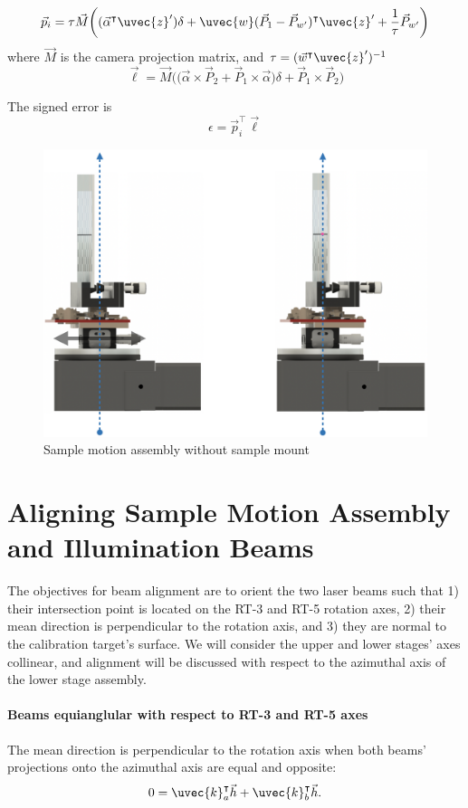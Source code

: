 \begin{equation}
    \vec{p}_i = \tau \vec{M}\bigg((\vec{\alpha}^\intercal \uvec{z}') \delta + \uvec{w}(\vec{P}_1 - \vec{P}_{w'})^\intercal \uvec{z}'  + \frac{1}{\tau} \vec{P}_{w'} \bigg)
\end{equation}
where $\vec{M}$ is the camera projection matrix, and $\tau = (\vec{w}^\intercal \uvec{z}')^{-1}$
\begin{equation}
    \vec{\ell} = \vec{M} \Big(\big(\vec{\alpha} \times \vec{P}_2 + \vec{P}_1 \times \vec{\alpha}\big)\delta + \vec{P}_1 \times \vec{P}_2 \Big)
\end{equation}

The signed error is
\begin{equation}
    \epsilon = \vec{p}^\intercal_i \vec{\ell}
\end{equation}

\begin{figure}
    \centering
    \includegraphics[width=0.5\linewidth]{figures/compact_alignment.png}
    \caption{Sample motion assembly without sample mount}
    \label{fig:sample_motion_assy}
\end{figure}

\section{Aligning Sample Motion Assembly and Illumination Beams}
The objectives for beam alignment are to orient the two laser beams such that 1) their intersection point is located on the RT-3 and RT-5 rotation axes, 2) their mean direction is perpendicular to the rotation axis, and 3) they are normal to the calibration target's surface. We will consider the upper and lower stages' axes collinear, and alignment will be discussed with respect to the azimuthal axis of the lower stage assembly.

\paragraph{Beams equianglular with respect to RT-3 and RT-5 axes}
The mean direction is perpendicular to the rotation axis when both beams' projections onto the azimuthal axis are equal and opposite:
\begin{equation}
    0 = \uvec{k}_a^\intercal \vec{h} + \uvec{k}_b^\intercal \vec{h}.
    \label{eqn:beam_equiangular_objective}
\end{equation}

